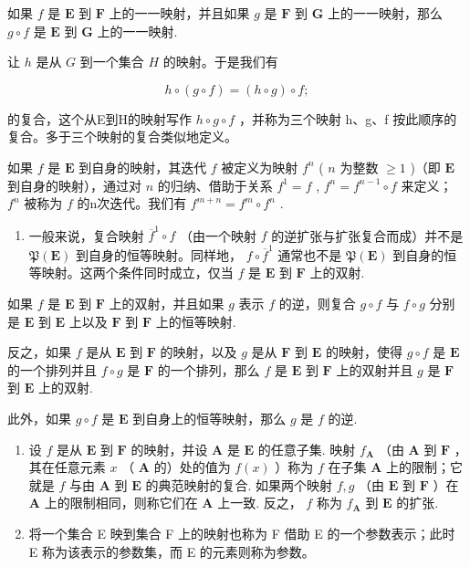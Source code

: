 如果 \(f\) 是 \(\mathbf{E}\) 到 \(\mathbf{F}\) 上的一一映射，并且如果 \(g\) 是 \(\mathbf{F}\) 到 \(\mathbf{G}\) 上的一一映射，那么 \(g \circ f\) 是 \(\mathbf{E}\) 到 \(\mathbf{G}\) 上的一一映射.

让 \(h\) 是从 \(G\) 到一个集合 \(H\) 的映射。于是我们有

\[
h \circ (g \circ f) = (h \circ g) \circ f;
\]

的复合，这个从E到H的映射写作 \(h \circ g \circ f\) ，并称为三个映射 h、g、f 按此顺序的复合。多于三个映射的复合类似地定义。

如果 \(f\) 是 \(\mathbf{E}\) 到自身的映射，其迭代 \(f\) 被定义为映射 \(f^n\) ( \(n\) 为整数 \(\geqslant 1\) )（即 \(\mathbf{E}\) 到自身的映射），通过对 \(n\) 的归纳、借助于关系 \(f^1 = f\) , \(f^n = f^{n-1} \circ f\) 来定义； \(f^n\) 被称为 \(f\) 的n次迭代。我们有 \(f^{m+n} = f^m \circ f^n\) .

\begin{enumerate}
\def\labelenumi{\arabic{enumi}.}
\setcounter{enumi}{11}
\tightlist
\item
  一般来说，复合映射 \(\overline{f}^{1} \circ f\) （由一个映射 \(f\) 的逆扩张与扩张复合而成）并不是 \(\mathfrak{P}(\mathbf{E})\) 到自身的恒等映射。同样地， \(f \circ \overline{f}^1\) 通常也不是 \(\mathfrak{P}(\mathbf{E})\) 到自身的恒等映射。这两个条件同时成立，仅当 \(f\) 是 \(\mathbf{E}\) 到 \(\mathbf{F}\) 上的双射.
\end{enumerate}

如果 \(f\) 是 \(\mathbf{E}\) 到 \(\mathbf{F}\) 上的双射，并且如果 \(g\) 表示 \(f\) 的逆，则复合 \(g \circ f\) 与 \(f \circ g\) 分别是 \(\mathbf{E}\) 到 \(\mathbf{E}\) 上以及 \(\mathbf{F}\) 到 \(\mathbf{F}\) 上的恒等映射.

反之，如果 \(f\) 是从 \(\mathbf{E}\) 到 \(\mathbf{F}\) 的映射，以及 \(g\) 是从 \(\mathbf{F}\) 到 \(\mathbf{E}\) 的映射，使得 \(g \circ f\) 是 \(\mathbf{E}\) 的一个排列并且 \(f \circ g\) 是 \(\mathbf{F}\) 的一个排列，那么 \(f\) 是 \(\mathbf{E}\) 到 \(\mathbf{F}\) 上的双射并且 \(g\) 是 \(\mathbf{F}\) 到 \(\mathbf{E}\) 上的双射.

此外，如果 \(g \circ f\) 是 \(\mathbf{E}\) 到自身上的恒等映射，那么 \(g\) 是 \(f\) 的逆.

\begin{enumerate}
\def\labelenumi{\arabic{enumi}.}
\setcounter{enumi}{12}
\item
  设 \(f\) 是从 \(\mathbf{E}\) 到 \(\mathbf{F}\) 的映射，并设 \(\mathbf{A}\) 是 \(\mathbf{E}\) 的任意子集. 映射 \(f_{\mathbf{A}}\) （由 \(\mathbf{A}\) 到 \(\mathbf{F}\) ，其在任意元素 \(x\) （ \(\mathbf{A}\) 的）处的值为 \(f(x)\) ）称为 \(f\) 在子集 \(\mathbf{A}\) 上的限制；它就是 \(f\) 与由 \(\mathbf{A}\) 到 \(\mathbf{E}\) 的典范映射的复合. 如果两个映射 \(f, g\) （由 \(\mathbf{E}\) 到 \(\mathbf{F}\) ）在 \(\mathbf{A}\) 上的限制相同，则称它们在 \(\mathbf{A}\) 上一致. 反之， \(f\) 称为 \(f_{\mathbf{A}}\) 到 \(\mathbf{E}\) 的扩张.
\item
  将一个集合 E 映到集合 F 上的映射也称为 F 借助 E 的一个参数表示；此时 E 称为该表示的参数集，而 E 的元素则称为参数。
\end{enumerate}


